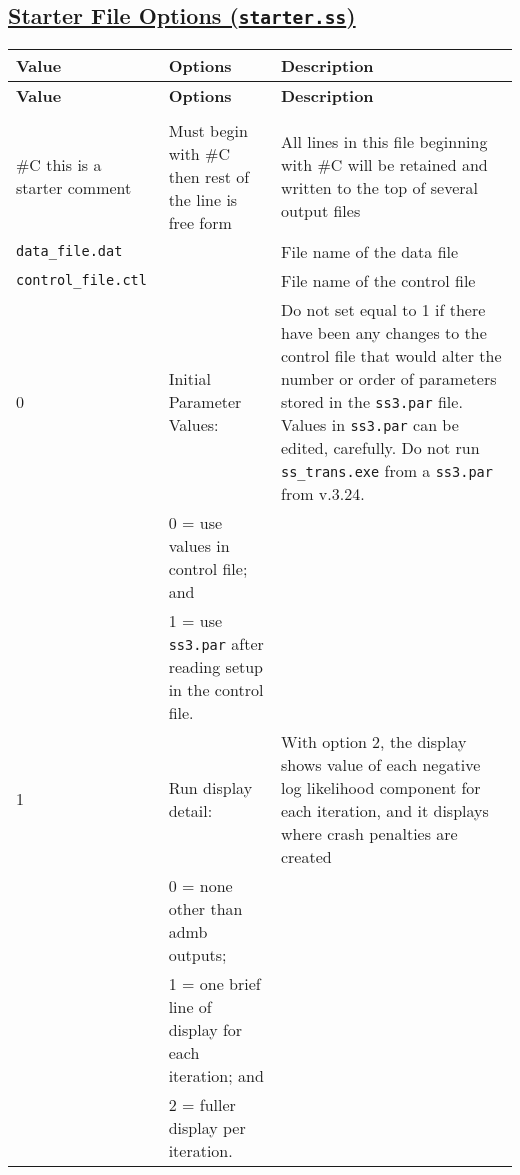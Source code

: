 {
\setlength\extrarowheight{4pt}
\begin{landscape}
\hypertarget{StarterOptions}{}
\subsection[Starter File Options (\texttt{starter.ss})]{\protect\hyperlink{StarterOptions}{Starter File Options (\texttt{starter.ss})}}	

\begin{longtable}{p{1.5cm} p{7.2cm} p{12.3cm}} 

 \hline
 \textbf{Value} & \textbf{Options} & \textbf{Description} \TBstrut\\ 
 \hline
 \endfirsthead
 
 \hline
 \textbf{Value} & \textbf{Options} & \textbf{Description} \TBstrut\\ 
 \hline
 \endhead
 
 \hline
 \endfoot
 
 \hline
 \multicolumn{3}{c}{\textbf{End of Starter File}} \Tstrut\Bstrut\\
 \hline
 \endlastfoot

 \#C this is a starter comment & Must begin with \#C then rest of the line is free form & All lines in this file beginning with \#C will be retained and written to the top of several output files \Tstrut\\
		
 \hline
 \texttt{data\_file.dat} &  & File name of the data file \Tstrut\\
		
 \hline
 \texttt{control\_file.ctl} &  & File name of the control file \Tstrut\\
   
 \hline		
 0 & Initial Parameter Values: & \multirow{1}{12.3cm}[-0.25cm]{\parbox{12.3cm}{Do not set equal to 1 if there have been any changes to the control file that would alter the number or order of parameters stored in the \texttt{ss3.par} file. Values in \texttt{ss3.par} can be edited, carefully. Do not run \texttt{ss\_trans.exe} from a \texttt{ss3.par} from v.3.24.}}\Tstrut\\
 & 0 = use values in control file; and &  \\
 & 1 = use \texttt{ss3.par} after reading setup in the control file. & \\
		
 \hline
 1 & Run display detail: &  \multirow{1}{12.3cm}[-0.25cm]{\parbox{12.3cm}{With option 2, the display shows value of each negative log likelihood component for each iteration, and it displays where crash penalties are created}} \Tstrut\\
   & 0 = none other than \gls{admb} outputs; & \\
   & 1 = one brief line of display for each iteration; and & \\
   & 2 = fuller display per iteration. & \\
		  

\end{longtable}
\end{landscape}}
